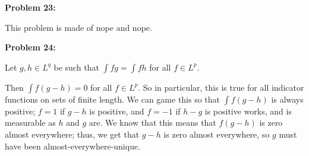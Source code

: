 \documentclass[a4paper,12pt]{article}
\begin{document}
\shunt

{\bf Problem 23:}

This problem is made of nope and nope.

\shunt

{\bf Problem 24:}

Let $g,h \in L^q$ be such that $\int fg = \int fh$ for all $f \in L^p$. 

Then $\int f(g-h) = 0$ for all $f \in L^p$. So in particular, this is true for all indicator functions on sets of finite length. We can game this so that $\int f(g-h)$ is always positive; $f = 1$ if $g-h$ is positive, and $f=-1$ if $h-g$ is positive works, and is measurable as $h$ and $g$ are. We know that this means that $f(g-h)$ is zero almost everywhere; thus, we get that $g-h$ is zero almost everywhere, so $g$ must have been almost-everywhere-unique.

\shunt
\end{document}
